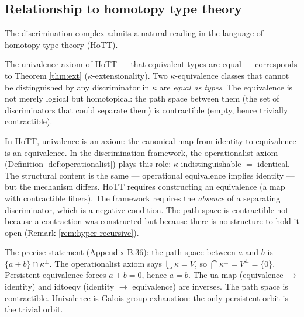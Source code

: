 \subsection{Relationship to homotopy type theory}

The discrimination complex admits a natural reading in the
language of homotopy type theory (HoTT).

\begin{proposition}\label{prop:univalence}
The univalence axiom of HoTT --- that equivalent types are
equal --- corresponds to Theorem \ref{thm:ext}
($\kappa$-extensionality). Two $\kappa$-equivalence classes
that cannot be distinguished by any discriminator in $\kappa$
are \emph{equal as types}. The equivalence is not merely
logical but homotopical: the path space between them (the
set of discriminators that could separate them) is
contractible (empty, hence trivially contractible).
\end{proposition}

\begin{remark}
\label{rem:native-univalence}
In HoTT, univalence is an axiom: the canonical map from
identity to equivalence is an equivalence. In the
discrimination framework, the operationalist axiom
(Definition \ref{def:operationalist}) plays this role:
$\kappa$-indistinguishable $=$ identical. The structural
content is the same --- operational equivalence implies
identity --- but the mechanism differs. HoTT requires
constructing an equivalence (a map with contractible
fibers). The framework requires the \emph{absence} of a
separating discriminator, which is a negative condition.
The path space is contractible not because a contraction
was constructed but because there is no structure to hold
it open (Remark \ref{rem:hyper-recursive}).

The precise statement (Appendix B.36): the path space
between $a$ and $b$ is $\{a + b\} \cap \kappa^\perp$.
The operationalist axiom says $\bigcup \kappa = V$,
so $\bigcap \kappa^\perp = V^\perp = \{0\}$.
Persistent equivalence forces $a + b = 0$, hence
$a = b$. The ua map (equivalence $\to$ identity) and
idtoeqv (identity $\to$ equivalence) are inverses.
The path space is contractible. Univalence is
Galois-group exhaustion: the only persistent orbit
is the trivial orbit.
\end{remark}


